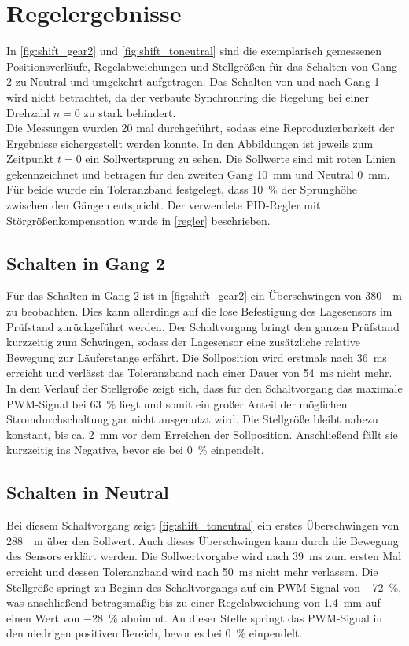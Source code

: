 \section{Regelergebnisse} \label{reglerergebnisse}
In \autoref{fig:shift_gear2} und \autoref{fig:shift_toneutral} sind die exemplarisch gemessenen Positionsverläufe, Regelabweichungen und Stellgrößen für das Schalten von Gang 2 zu Neutral und umgekehrt aufgetragen. Das Schalten von und nach Gang 1 wird nicht betrachtet, da der verbaute Synchronring die Regelung bei einer Drehzahl $n=0$ zu stark behindert.\\
Die Messungen wurden 20 mal durchgeführt, sodass eine Reproduzierbarkeit der Ergebnisse sichergestellt werden konnte. In den Abbildungen ist jeweils zum Zeitpunkt $t=0$ ein Sollwertsprung zu sehen. Die Sollwerte sind mit roten Linien gekennzeichnet und betragen für den zweiten Gang \SI{10}{mm} und Neutral \SI{0}{mm}. Für beide wurde ein Toleranzband festgelegt, dass \SI{10}{\%} der Sprunghöhe zwischen den Gängen entspricht. Der verwendete PID-Regler mit Störgrößenkompensation wurde in \autoref{regler} beschrieben.

\subsection{Schalten in Gang 2}

Für das Schalten in Gang 2 ist in \autoref{fig:shift_gear2} ein Überschwingen von \SI{380}{\mu m} zu beobachten. Dies kann allerdings auf die lose Befestigung des Lagesensors im Prüfstand zurückgeführt werden. Der Schaltvorgang bringt den ganzen Prüfstand kurzzeitig zum Schwingen, sodass der Lagesensor eine zusätzliche relative Bewegung zur Läuferstange erfährt. Die Sollposition wird erstmals nach \SI{36}{ms} erreicht und verlässt das Toleranzband nach einer Dauer von \SI{54}{ms} nicht mehr. In dem Verlauf der Stellgröße zeigt sich, dass für den Schaltvorgang das maximale PWM-Signal bei \SI{63}{\%} liegt und somit ein großer Anteil der möglichen Stromdurchschaltung gar nicht ausgenutzt wird. Die Stellgröße bleibt nahezu konstant, bis ca. \SI{2}{mm} vor dem Erreichen der Sollposition. Anschließend fällt sie kurzzeitig ins Negative, bevor sie bei \SI{0}{\%} einpendelt.  

\subsection{Schalten in Neutral}
Bei diesem Schaltvorgang zeigt \autoref{fig:shift_toneutral} ein erstes Überschwingen von \SI{288}{\mu m} über den Sollwert. Auch dieses Überschwingen kann durch die Bewegung des Sensors erklärt werden. Die Sollwertvorgabe wird nach \SI{39}{ms} zum ersten Mal erreicht und dessen Toleranzband wird nach \SI{50}{ms} nicht mehr verlassen. Die Stellgröße springt zu Beginn des Schaltvorgangs auf ein PWM-Signal von \SI{-72}{\%}, was anschließend betragsmäßig bis zu einer Regelabweichung von \SI{1,4}{mm} auf einen Wert von \SI{-28}{\%} abnimmt. An dieser Stelle springt das PWM-Signal in den niedrigen positiven Bereich, bevor es bei \SI{0}{\%} einpendelt.

